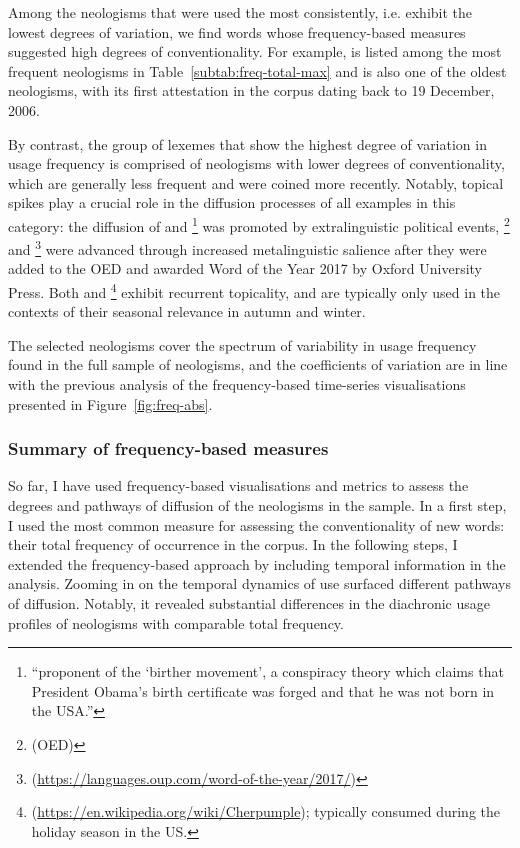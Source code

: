 \documentclass[
  a4paper,
  abstract=on,
  captions=tableabove
  ]{scrartcl}
\begin{document}
      Among the neologisms that were used the most consistently, i.e. exhibit the lowest degrees of variation, we find words whose frequency-based measures suggested high degrees of conventionality. For example,  is listed among the most frequent neologisms in Table~\ref{subtab:freq-total-max} and is also one of the oldest neologisms, with its first attestation in the corpus dating back to 19 December, 2006.

      By contrast, the group of lexemes that show the highest degree of variation in usage frequency is comprised of neologisms with lower degrees of conventionality, which are generally less frequent and were coined more recently. Notably, topical spikes play a crucial role in the diffusion processes of all examples in this category: the diffusion of  and \footnote{\enquote{proponent of the \enquote{birther movement}, a conspiracy theory which claims that President Obama's birth certificate was forged and that he was not born in the USA.}} was promoted by extralinguistic political events, \footnote{ (OED)} and \footnote{ (\url{https://languages.oup.com/word-of-the-year/2017/})} were advanced through increased metalinguistic salience after they were added to the OED and awarded Word of the Year 2017 by Oxford University Press. Both  and \footnote{ (\url{https://en.wikipedia.org/wiki/Cherpumple}); typically consumed during the holiday season in the US.} exhibit recurrent topicality, and are typically only used in the contexts of their seasonal relevance in autumn and winter.

      The selected neologisms cover the spectrum of variability in usage frequency found in the full sample of neologisms, and the coefficients of variation are in line with the previous analysis of the frequency-based time-series visualisations presented in Figure~\ref{fig:freq-abs}.


      \subsubsection{Summary of frequency-based measures}

        So far, I have used frequency-based visualisations and metrics to assess the degrees and pathways of diffusion of the neologisms in the sample. In a first step, I used the most common measure for assessing the conventionality of new words: their total frequency of occurrence in the corpus. In the following steps, I extended the frequency-based approach by including temporal information in the analysis. Zooming in on the temporal dynamics of use surfaced different pathways of diffusion. Notably, it revealed substantial differences in the diachronic usage profiles of neologisms with comparable total frequency.
\end{document}
